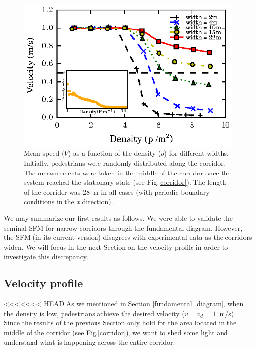 \begin{figure}[htbp!]
\includegraphics[width=\columnwidth]
{plots/speed-density_vd1_multiple_widths.eps}
\caption{\label{fundamental_diagram_speed} Mean speed ($V$) as a function of the density ($\rho$) for different widths. Initially, 
pedestrians were randomly distributed along the corridor. The measurements were taken in the middle
of the corridor once the system reached the stationary state (see Fig.\ref{corridor}). The length of the corridor 
was 28~m in all cases (with periodic boundary conditions in the \textit{x} direction).}
\end{figure}

We may summarize our first results as follows. We were able to validate the seminal SFM for narrow corridors through the fundamental diagram. However, the SFM (in its current version) disagrees with experimental data as the corridors widen. We will focus in the next Section on the velocity profile in order to investigate this discrepancy. 

\subsection{\label{velocity_profile} Velocity profile}

<<<<<<< HEAD
As we mentioned in Section \ref{fundamental_diagram}, when the density is low, pedestrians achieve the desired velocity ($v=v_d=1$~m/s). Since the results of the previous Section only hold for the area located in the middle of the corridor (see Fig.\ref{corridor}), we want to shed some light and understand what is happening across the entire corridor.\\

